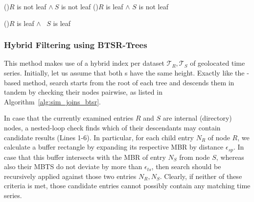 \begin{algorithm}[!ht]
\begin{small}
  \DontPrintSemicolon
  \BlankLine
  \If(){$R$ is not leaf $\land \ S$ is not leaf}{
  }
  \ElseIf(){$R$ is leaf $\land$ $S$ is not leaf}{
  }

  \ElseIf(){$R$ is leaf $\land$ \  $S$ is leaf}{
  }
  \caption{$SimJoinSAX(R, S, \epsilon_{sp}, \epsilon_{ts})$}
  \label{alg:sim_joins_isax}
\end{small}   
\end{algorithm}

\subsubsection{Hybrid Filtering using BTSR-Trees}
\label{subsubsec:btsr_appr}
This method makes use of a hybrid \btsr index per dataset $\mathcal{T}_{R}, \mathcal{T}_{S}$ of geolocated time series. Initially, let us assume that both {\btsr}s have the same height. Exactly like the  \isax-based method, search starts from the root of each tree and descends them in tandem by checking their nodes pairwise, as listed in Algorithm~\ref{alg:sim_joins_btsr}.

In case that the currently examined entries $R$ and $S$ are internal (directory) nodes, a nested-loop check finds which of their descendants may contain candidate results (Lines 1-6). In particular, for each child entry $N_R$ of node $R$, we calculate a buffer rectangle by expanding its respective MBR by distance $\epsilon_{sp}$. In case that this buffer intersects with the MBR of entry $N_S$ from node $S$, whereas also their MBTS do not deviate by more than $\epsilon_{ts}$, then search should be recursively applied against those two entries $N_R, N_S$. Clearly, if neither of these criteria is met, those candidate entries cannot possibly contain any matching time series. 

